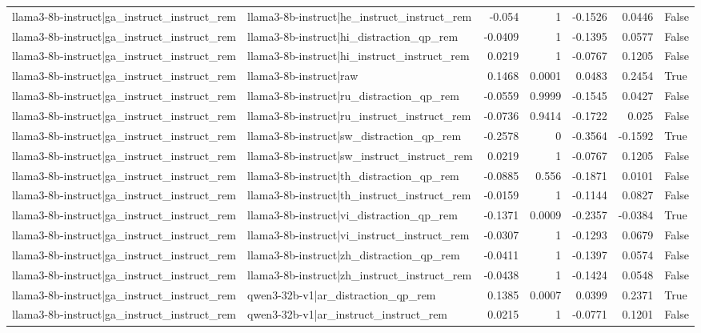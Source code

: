 \begin{table}
\begin{tabular}{l l r r r r l}
llama3-8b-instruct|ga_instruct_instruct_rem & llama3-8b-instruct|he_instruct_instruct_rem & -0.054 & 1 & -0.1526 & 0.0446 & False \\
llama3-8b-instruct|ga_instruct_instruct_rem & llama3-8b-instruct|hi_distraction_qp_rem & -0.0409 & 1 & -0.1395 & 0.0577 & False \\
llama3-8b-instruct|ga_instruct_instruct_rem & llama3-8b-instruct|hi_instruct_instruct_rem & 0.0219 & 1 & -0.0767 & 0.1205 & False \\
llama3-8b-instruct|ga_instruct_instruct_rem & llama3-8b-instruct|raw & 0.1468 & 0.0001 & 0.0483 & 0.2454 & True \\
llama3-8b-instruct|ga_instruct_instruct_rem & llama3-8b-instruct|ru_distraction_qp_rem & -0.0559 & 0.9999 & -0.1545 & 0.0427 & False \\
llama3-8b-instruct|ga_instruct_instruct_rem & llama3-8b-instruct|ru_instruct_instruct_rem & -0.0736 & 0.9414 & -0.1722 & 0.025 & False \\
llama3-8b-instruct|ga_instruct_instruct_rem & llama3-8b-instruct|sw_distraction_qp_rem & -0.2578 & 0 & -0.3564 & -0.1592 & True \\
llama3-8b-instruct|ga_instruct_instruct_rem & llama3-8b-instruct|sw_instruct_instruct_rem & 0.0219 & 1 & -0.0767 & 0.1205 & False \\
llama3-8b-instruct|ga_instruct_instruct_rem & llama3-8b-instruct|th_distraction_qp_rem & -0.0885 & 0.556 & -0.1871 & 0.0101 & False \\
llama3-8b-instruct|ga_instruct_instruct_rem & llama3-8b-instruct|th_instruct_instruct_rem & -0.0159 & 1 & -0.1144 & 0.0827 & False \\
llama3-8b-instruct|ga_instruct_instruct_rem & llama3-8b-instruct|vi_distraction_qp_rem & -0.1371 & 0.0009 & -0.2357 & -0.0384 & True \\
llama3-8b-instruct|ga_instruct_instruct_rem & llama3-8b-instruct|vi_instruct_instruct_rem & -0.0307 & 1 & -0.1293 & 0.0679 & False \\
llama3-8b-instruct|ga_instruct_instruct_rem & llama3-8b-instruct|zh_distraction_qp_rem & -0.0411 & 1 & -0.1397 & 0.0574 & False \\
llama3-8b-instruct|ga_instruct_instruct_rem & llama3-8b-instruct|zh_instruct_instruct_rem & -0.0438 & 1 & -0.1424 & 0.0548 & False \\
llama3-8b-instruct|ga_instruct_instruct_rem & qwen3-32b-v1|ar_distraction_qp_rem & 0.1385 & 0.0007 & 0.0399 & 0.2371 & True \\
llama3-8b-instruct|ga_instruct_instruct_rem & qwen3-32b-v1|ar_instruct_instruct_rem & 0.0215 & 1 & -0.0771 & 0.1201 & False \\

\end{tabular}
\end{table}
